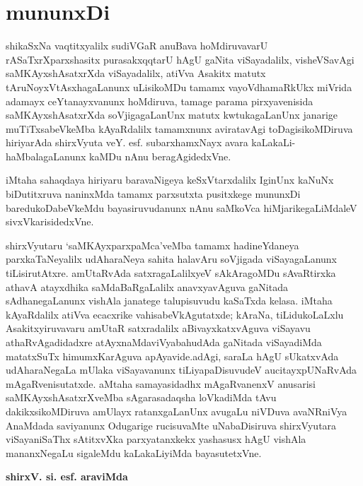 \chapter*{mununxDi}
\vskip -20pt


shikaSxNa vaqtitxyalilx sudiVGaR anuBava hoMdiruvavarU rASaTxrXparxshasitx purasakxqqtarU hAgU gaNita viSayadalilx, visheVSavAgi saMKAyxshAsatxrXda viSayadalilx, atiVva Asakitx matutx tAruNoyxVtAsxhagaLanunx uLisikoMDu tamamx vayoVdhamaRkUkx  miVrida adamayx ceYtanayxvanunx hoMdiruva, tamage parama pirxyavenisida saMKAyxshAsatxrXda soVjigagaLanUnx matutx  kwtukagaLanUnx janarige muTiTxsabeVkeMba  kAyaRdalilx tamamxnunx aviratavAgi toDagisikoMDiruva hiriyarAda shirxVyuta veY. esf. subarxhamxNayx avara kaLakaLi-haMbalagaLanunx kaMDu nAnu beragAgidedxVne.

iMtaha  sahaqdaya hiriyaru baravaNigeya keSxVtarxdalilx IginUnx kaNuNx biDutitxruva naninxMda tamamx  parxsutxta pusitxkege mununxDi baredukoDabeVkeMdu bayasiruvudanunx nAnu saMkoVca hiMjarikegaLiMdaleV sivxVkarisidedxVne.

shirxVyutaru `saMKAyxparxpaMca'veMba tamamx hadineYdaneya parxkaTaNeyalilx udA\break haraNeya sahita halavAru soVjigada viSayagaLanunx tiLisirutAtxre. amUtaRvAda satxragaLalilxyeV  sAkAragoMDu sAvaRtirxka athavA atayxdhika saMdaBaRgaLalilx anavxya\break vAguva gaNitada  sAdhanegaLanunx vishAla janatege talupisuvudu kaSaTxda kelasa. iMtaha kAyaR\-dalilx  atiVva ecacxrike  vahisabeVkAgutatxde; kAraNa, tiLidukoLaLxlu Asakitxyiruva\-varu amUtaR satxradalilx aBivayxkatxvAguva viSayavu athaRvAgadidadxre atAyxnaMda\break viVyabahudAda gaNitada viSayadiMda  matatxSuTx himumxKarAguva apAyavide.\break adAgi, saraLa hAgU sUkatxvAda udAharaNegaLa mUlaka viSayavanunx tiLiya\break paDisuvudeV aucitayxpUNaRvAda mAgaRvenisutatxde. aMtaha samayasidadhx  mAgaR\break vanenxV anusarisi saMKAyxshAsatxrXveMba sAgarasadaqsha  loVkadiMda  tAvu dakikxsikoMDiruva amUlayx ratanxgaLanUnx  avugaLu niVDuva avaNRniVya AnaMdada saviyanunx Odugarige rucisuvaMte  uNabaDisiruva  shirxVyutara viSayaniSaThx  sAtitxvXka  parxyatanxkekx yashasusx  hAgU vishAla mananxNegaLu sigaleMdu kaLakaLiyiMda bayasutetxVne.
\begin{flushright}
{\bf shirxV. si. esf. araviMda}
\end{flushright}
